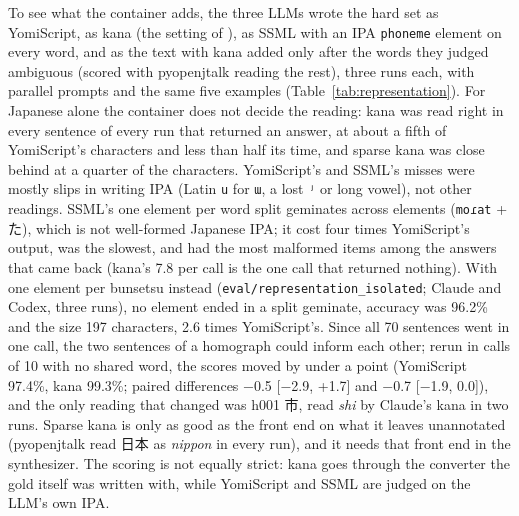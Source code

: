 \documentclass[11pt,a4paper]{article}
\newcommand{\ys}[1]{\mbox{\texttt{#1}}}
\begin{document}
To see what the container adds, the three LLMs wrote the hard set as YomiScript, as kana (the setting of
\citet{koriyama2026g2p}), as SSML with an IPA \texttt{phoneme} element on every word, and as the text with kana added
only after the words they judged ambiguous (scored with pyopenjtalk reading the rest), three runs each, with parallel
prompts and the same five examples (Table~\ref{tab:representation}). For Japanese alone the container does not decide
the reading: kana was read right in every sentence of every run that returned an answer, at about a fifth of
YomiScript's characters and less than half its time, and sparse kana was close behind at a quarter of the characters.
YomiScript's and SSML's misses were mostly slips in writing IPA (Latin \ys{u} for \ys{ɯ}, a lost \ys{ʲ} or long
vowel), not other readings. SSML's one element per word split geminates across elements (\ys{moɾat} + た), which is
not well-formed Japanese IPA; it cost four times YomiScript's output, was the slowest, and had the most malformed
items among the answers that came back (kana's 7.8 per call is the one call that returned nothing). With one element per
bunsetsu instead (\texttt{eval/representation\_isolated}; Claude and Codex, three runs), no element ended in a split
geminate, accuracy was 96.2\% and the size 197 characters, 2.6 times YomiScript's. Since all 70 sentences went in one
call, the two sentences of a homograph could inform each other; rerun in calls of 10 with no shared word, the scores
moved by under a point (YomiScript 97.4\%, kana 99.3\%; paired differences $-$0.5 [$-$2.9, +1.7] and $-$0.7
[$-$1.9, 0.0]), and the only reading that changed was h001 市, read \emph{shi} by Claude's kana in two runs.
Sparse kana is only as good as the front end on what it leaves unannotated (pyopenjtalk read 日本 as \emph{nippon}
in every run), and it needs that front end in the synthesizer. The scoring is not equally strict: kana goes through
the converter the gold itself was written with, while YomiScript and SSML are judged on the LLM's own IPA.
\end{document}
